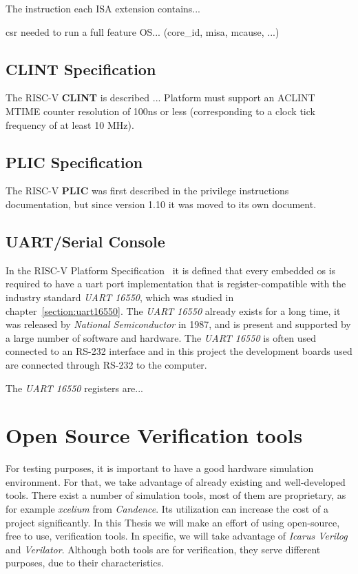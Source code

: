 The instruction each ISA extension contains...

\acrfull{csr} needed to run a full feature OS... (core\_id, misa, mcause, ...)

\subsection{CLINT Specification}
The RISC-V \textbf{CLINT} is described ...
Platform must support an ACLINT MTIME counter resolution of 100ns or less (corresponding to a clock tick frequency of at least 10 MHz).

\subsection{PLIC Specification}
The RISC-V \textbf{PLIC} was first described in the privilege instructions documentation, but since version 1.10 it was moved to its own document.

\subsection{UART/Serial Console}
\label{section:serial_console}
In the RISC-V Platform Specification~\cite{riscv_platform_specification} it is defined that every embedded \acrfull{os} is required to have a \acrshort{uart} port implementation that is register-compatible with the industry standard \textit{UART 16550}, which was studied in chapter~\ref{section:uart16550}. The \textit{UART 16550} already exists for a long time, it was released by \textit{National Semiconductor} in 1987, and is present and supported by a large number of software and hardware. The \textit{UART 16550} is often used connected to an RS-232 interface and in this project the development boards used are connected through RS-232 to the computer.

The \textit{UART 16550} registers are...

\section{Open Source Verification tools}
\label{section:verification_tools}
For testing purposes, it is important to have a good hardware simulation environment. For that, we take advantage of already existing and well-developed tools. There exist a number of simulation tools, most of them are proprietary, as for example \textit{xcelium} from \textit{Candence}. Its utilization can increase the cost of a project significantly. In this Thesis we will make an effort of using open-source, free to use, verification tools. In specific, we will take advantage of \textit{Icarus Verilog} and \textit{Verilator}. Although both tools are for verification, they serve different purposes, due to their characteristics.

